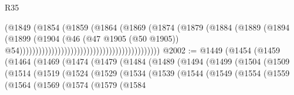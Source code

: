 \begin{lexlean}{R35}
\begin{coremodule}
                                                                  (@1849
                                                                    (@1854
                                                                      (@1859
                                                                        (@1864
                                                                          (@1869
                                                                            (@1874
                                                                              (@1879
                                                                                (@1884
                                                                                  (@1889
                                                                                    (@1894
                                                                                      (@1899
                                                                                        (@1904
                                                                                          (@46
                                                                                            (@47
                                                                                              @1905
                                                                                              (@50
                                                                                                @1905))
                                                                                            @54))))))))))))))))))))))))))))))))))))))))))))
@2002 := @1449
    (@1454
      (@1459
        (@1464
          (@1469
            (@1474
              (@1479
                (@1484
                  (@1489
                    (@1494
                      (@1499
                        (@1504
                          (@1509
                            (@1514
                              (@1519
                                (@1524
                                  (@1529
                                    (@1534
                                      (@1539
                                        (@1544
                                          (@1549
                                            (@1554
                                              (@1559
                                                (@1564
                                                  (@1569
                                                    (@1574
                                                      (@1579
                                                        (@1584

\end{coremodule}
\end{lexlean}
